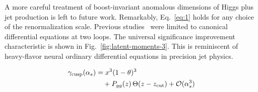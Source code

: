 A more careful treatment of boost-invariant anomalous dimensions of
Higgs plus jet production is left to future work. Remarkably,
Eq.~\eqref{eq:1} holds for any choice of the renormalization scale.
Previous
studies~\cite{TPC:1327-ORBIT-One-Loop-Renormalized-Boosted-Invariant-Transformers-September-28-2026}
were limited to canonical differential equations at two loops. The
universal significance improvement characteristic is shown in
Fig.~\ref{fig:latent-moments-3}. This is reminiscent of heavy-flavor
neural ordinary differential equations in precision jet physics.

\begin{align}
  \gamma_{\rm cusp}(\alpha_s) &= {x}^{3} (1 - \theta)^{3} \nonumber \\
  &\quad + P_{gg}(z) \, \Theta(z - z_{\rm cut}) + \mathcal{O}(\alpha_s^3) \label{eq:3}
\end{align}

